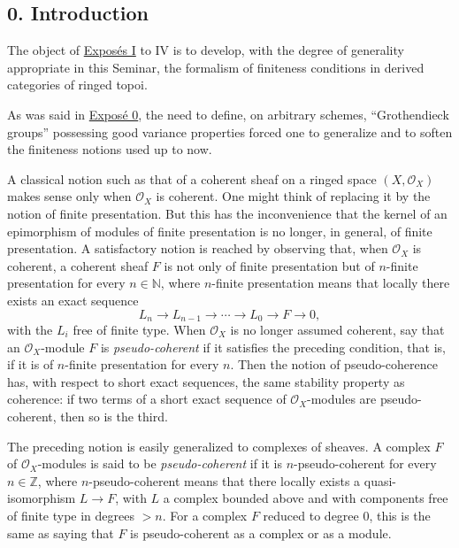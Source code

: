 \subsection*{0. Introduction}
The object of \hyperlink{sga6.e01.expose}{Exposés I} to IV is to develop, with the degree of generality appropriate in this Seminar, the formalism of finiteness conditions in derived categories of ringed topoi.

As was said in \hyperlink{sga6.e00.expose}{Exposé 0}, the need to define, on arbitrary schemes, ``Grothendieck groups'' possessing good variance properties forced one to generalize and to soften the finiteness notions used up to now.

A classical notion such as that of a coherent sheaf on a ringed space \((X,\mathcal O_X)\) makes sense only when \(\mathcal O_X\) is coherent. One might think of replacing it by the notion of finite presentation. But this has the inconvenience that the kernel of an epimorphism of modules of finite presentation is no longer, in general, of finite presentation. A satisfactory notion is reached by observing that, when \(\mathcal O_X\) is coherent, a coherent sheaf \(F\) is not only of finite presentation but of \(n\)-finite presentation for every \(n\in\mathbb N\), where \(n\)-finite presentation means that locally there exists an exact sequence
\[
  L_n\longrightarrow L_{n-1}\longrightarrow \cdots \longrightarrow L_0\longrightarrow F\longrightarrow 0,
\]
with the \(L_i\) free of finite type. When \(\mathcal O_X\) is no longer assumed coherent, say that an \(\mathcal O_X\)-module \(F\) is \emph{pseudo-coherent} if it satisfies the preceding condition, that is, if it is of \(n\)-finite presentation for every \(n\). Then the notion of pseudo-coherence has, with respect to short exact sequences, the same stability property as coherence: if two terms of a short exact sequence of \(\mathcal O_X\)-modules are pseudo-coherent, then so is the third.

The preceding notion is easily generalized to complexes of sheaves. A complex \(F\) of \(\mathcal O_X\)-modules is said to be \emph{pseudo-coherent} if it is \(n\)-pseudo-coherent for every \(n\in\mathbb Z\), where \(n\)-pseudo-coherent means that there locally exists a quasi-isomorphism \(L\to F\), with \(L\) a complex bounded above and with components free of finite type in degrees \(>n\). For a complex \(F\) reduced to degree \(0\), this is the same as saying that \(F\) is pseudo-coherent as a complex or as a module.

